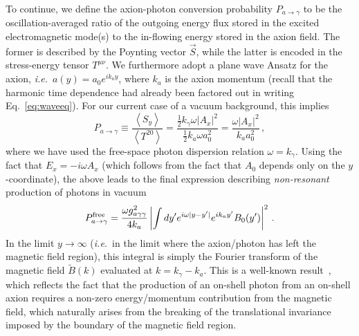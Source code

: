 \documentclass[twocolumn,superscriptaddress,floatfix,preprintnumbers,prd,nofootinbib,aps,10pt]{revtex4-2}
\renewcommand\({\left(}
\renewcommand\){\right)}
\renewcommand\[{\left[}
\renewcommand\]{\right]}
\newcommand\ie{{\it i.e.}~}
\begin{document}
To continue, we define the axion-photon conversion probability $P_{a \rightarrow \gamma}$ to be the oscillation-averaged ratio of the outgoing energy flux stored in the excited electromagnetic mode(s) to the in-flowing energy stored in the axion field. The former is described by the Poynting vector $\vec{S}$, while the latter is encoded in the stress-energy tensor $T^{\mu\nu}$. We furthermore adopt a plane wave Ansatz for the axion, \ie $a(y) = a_0 e^{i k_a y}$, where $k_a$ is the axion momentum (recall that the harmonic time dependence had already been factored out in writing Eq.~\ref{eq:waveeq}). For our current case of a vacuum background, this implies
%
\begin{equation}\label{eq:P}
    P_{a \rightarrow \gamma} \equiv \frac{\left< S_y\right>}{\left<T^{20}\right>} = \frac{\frac{1}{2} k_\gamma \omega |A_x|^2}{\frac{1}{2} k_a \omega a_0^2}= \frac{\omega |A_x|^2}{k_a a_0^2} \, ,
\end{equation}
%
where we have used the free-space photon dispersion relation $\omega = k_\gamma$. Using the fact that $E_x = -i\omega A_x$ (which follows from the fact that $A_0$ depends only on the $y$-coordinate), the above leads to the final expression describing \textit{non-resonant} production of photons in vacuum 
%
\begin{equation}\label{eq:P_free}
    P_{a \rightarrow \gamma}^{\rm free} = \frac{\omega g_{a\gamma\gamma}^2}{4 k_a} \left| \int dy' e^{i \omega |y - y'|} e^{i k_a y'} B_0(y') \right|^2 \, .
\end{equation}
%
In the limit $y \rightarrow \infty$ (\ie in the limit where the axion/photon has left the magnetic field region), this integral is simply the Fourier transform of the magnetic field $\tilde{B}(k)$ evaluated at $k = k_\gamma - k_a$. This is a well-known result~\cite{Raffelt:1987im,Sigl:2017sew}, which reflects the fact that the production of an on-shell photon from an on-shell axion requires a non-zero energy/momentum contribution from the magnetic field, which naturally arises from the breaking of the translational invariance imposed by the boundary of the magnetic field region.
\end{document}
